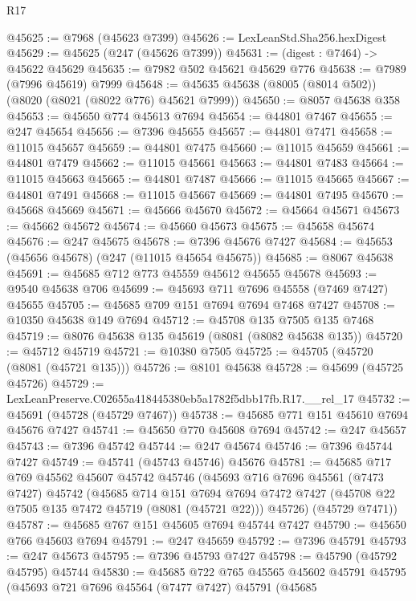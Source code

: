 \begin{lexlean}{R17}
\begin{coremodule}
@45625 := @7968 (@45623 @7399)
@45626 := LexLeanStd.Sha256.hexDigest
@45629 := @45625 (@247 (@45626 @7399))
@45631 := (digest : @7464) -> @45622 @45629
@45635 := @7982 @502 @45621 @45629 @776
@45638 := @7989 (@7996 @45619) @7999
@45648 := @45635 @45638 (@8005 (@8014 @502)) (@8020 (@8021 (@8022 @776) @45621 @7999))
@45650 := @8057 @45638 @358
@45653 := @45650 @774 @45613 @7694
@45654 := @44801 @7467
@45655 := @247 @45654
@45656 := @7396 @45655
@45657 := @44801 @7471
@45658 := @11015 @45657
@45659 := @44801 @7475
@45660 := @11015 @45659
@45661 := @44801 @7479
@45662 := @11015 @45661
@45663 := @44801 @7483
@45664 := @11015 @45663
@45665 := @44801 @7487
@45666 := @11015 @45665
@45667 := @44801 @7491
@45668 := @11015 @45667
@45669 := @44801 @7495
@45670 := @45668 @45669
@45671 := @45666 @45670
@45672 := @45664 @45671
@45673 := @45662 @45672
@45674 := @45660 @45673
@45675 := @45658 @45674
@45676 := @247 @45675
@45678 := @7396 @45676 @7427
@45684 := @45653 (@45656 @45678) (@247 (@11015 @45654 @45675))
@45685 := @8067 @45638
@45691 := @45685 @712 @773 @45559 @45612 @45655 @45678
@45693 := @9540 @45638 @706
@45699 := @45693 @711 @7696 @45558 (@7469 @7427) @45655
@45705 := @45685 @709 @151 @7694 @7694 @7468 @7427
@45708 := @10350 @45638 @149 @7694
@45712 := @45708 @135 @7505 @135 @7468
@45719 := @8076 @45638 @135 @45619 (@8081 (@8082 @45638 @135))
@45720 := @45712 @45719
@45721 := @10380 @7505
@45725 := @45705 (@45720 (@8081 (@45721 @135)))
@45726 := @8101 @45638
@45728 := @45699 (@45725 @45726)
@45729 := LexLeanPreserve.C02655a418445380eb5a1782f5dbb17fb.R17.__rel_17
@45732 := @45691 (@45728 (@45729 @7467))
@45738 := @45685 @771 @151 @45610 @7694 @45676 @7427
@45741 := @45650 @770 @45608 @7694
@45742 := @247 @45657
@45743 := @7396 @45742
@45744 := @247 @45674
@45746 := @7396 @45744 @7427
@45749 := @45741 (@45743 @45746) @45676
@45781 := @45685
    @717
    @769
    @45562
    @45607
    @45742
    @45746
    (@45693
      @716
      @7696
      @45561
      (@7473 @7427)
      @45742
      (@45685
        @714
        @151
        @7694
        @7694
        @7472
        @7427
        (@45708 @22 @7505 @135 @7472 @45719 (@8081 (@45721 @22)))
        @45726)
      (@45729 @7471))
@45787 := @45685 @767 @151 @45605 @7694 @45744 @7427
@45790 := @45650 @766 @45603 @7694
@45791 := @247 @45659
@45792 := @7396 @45791
@45793 := @247 @45673
@45795 := @7396 @45793 @7427
@45798 := @45790 (@45792 @45795) @45744
@45830 := @45685
    @722
    @765
    @45565
    @45602
    @45791
    @45795
    (@45693
      @721
      @7696
      @45564
      (@7477 @7427)
      @45791
      (@45685

\end{coremodule}
\end{lexlean}
